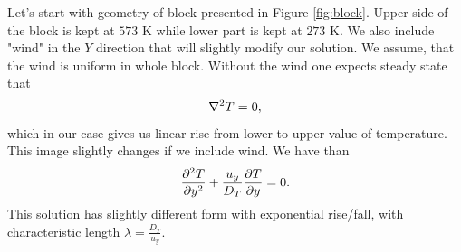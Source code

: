 \documentclass{article}
\begin{document}
Let's start with geometry of block presented in Figure \ref{fig:block}. Upper side of the block is kept at $573$ K while lower part is kept at 
$273$ K. We also include "wind" in the $Y$ direction that will slightly modify our solution. 
We assume, that the wind is uniform in whole block.
Without the wind one expects steady state that 
\begin{equation}
    \laplacian{T} = 0,
\end{equation}
which in our case gives us linear rise from lower to upper value of temperature. This image slightly changes 
if we include wind.
We have than 
\begin{equation}
    \pdv[2]{T}{y} + \frac{u_y}{D_T}\pdv{T}{y} = 0.
\end{equation}
This solution has slightly different form with exponential rise/fall, with characteristic length  $\lambda  = \frac{D_T}{u_y}$.
\end{document}

